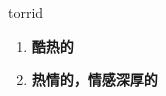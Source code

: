 
\begin{frame}
{\huge torrid}
\begin{center}
\begin{enumerate}\Large
  \item \textbf{酷热的}
  \item \textbf{热情的，情感深厚的}
\end{enumerate}
\end{center}
\end{frame}

